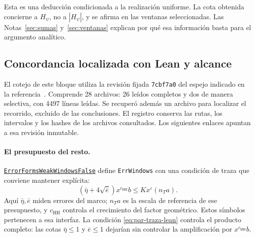 Esta es una deducción condicionada a la realización uniforme.
La cota obtenida concierne a $H_\psi$, no a $|H_\psi|$, y se
afirma en las ventanas seleccionadas. Las Notas~\ref{sec:sumas}
y~\ref{sec:ventanas} explican por qué esa información basta
para el argumento analítico.

\subsection{Concordancia localizada con Lean y alcance}

El cotejo de este bloque utiliza la revisión fijada
\texttt{7cbf7a0} del espejo indicado en la referencia~\cite{lean}.
Comprende 28 archivos: 26 leídos completos y dos de manera selectiva,
con 4497 líneas leídas. Se recuperó además un archivo para localizar
el recorrido, excluido de las conclusiones. El registro conserva
las rutas, los intervalos y los hashes de los archivos consultados.
Los siguientes enlaces apuntan a esa revisión inmutable.

\paragraph{El presupuesto del resto.}
\href{https://github.com/CocoSgt/riemann-hypothesis-lean/blob/7cbf7a0c32fca1badf05931879a37c3f8a2b03b4/src/Formalism/SizeWindowBrackets/ErrorFormsWeakWindowsFalse.lean}{\texttt{Error\allowbreak{}Forms\allowbreak{}Weak\allowbreak{}Windows\allowbreak{}False}}
define \texttt{ErrWindows} con una condición de traza que conviene
mantener explícita:
\begin{equation}
 (\bar\eta+4\sqrt{\bar e})x^{c_{\mathrm{HH}}}b
       \le Kx^\varepsilon(n_Ta).
 \label{eq:par-traza-lean}
\end{equation}
Aquí $\bar\eta,\bar e$ miden errores del marco; $n_Ta$ es la
escala de referencia de ese presupuesto, y $c_{\mathrm{HH}}$
controla el crecimiento del factor geométrico. Estos símbolos
pertenecen a esa interfaz. La condición \eqref{eq:par-traza-lean}
controla el producto completo: las cotas
$\bar\eta\le1$ y $\bar e\le1$ dejarían sin controlar la
amplificación por $x^{c_{\mathrm{HH}}}b$.

